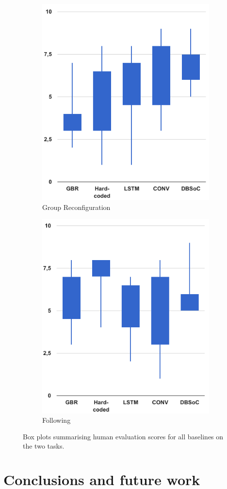 \documentclass[letterpaper, 10 pt, conference]{ieeeconf}
\begin{document}
	\begin{figure}[tbh]
      \begin{subfigure}[b]{0.40\columnwidth}
    \includegraphics[scale = 0.30]{images/group_candle.png}
    \caption{Group Reconfiguration}
    \label{fig:static-res}
  \end{subfigure}
  \hspace{5mm}
  \begin{subfigure}[b]{0.40\columnwidth}
    \includegraphics[scale = 0.30]{images/follow_candle.png}
    \caption{Following}
    \label{fig:follow}
  \end{subfigure} 
  \caption{Box plots summarising human evaluation scores for all baselines on the two tasks.}
  \label{fig:human}
  \end{figure}


\section{Conclusions and future work} 



\end{document}
